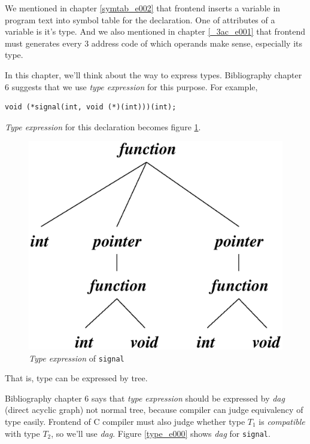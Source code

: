 \label{type_e001}
We mentioned in chapter \ref{symtab_e002} that
frontend inserts a variable in program text into symbol table
for the declaration. One of attributes of a variable is it's type.
And we also mentioned in chapter \ref{_3ac_e001} that
frontend must generates every 3 address code of which operands make
sense, especially its type.

In this chapter, we'll think about the way to express types.
Bibliography \cite{doragon} chapter 6 suggests that we
use {\em type expression} for this purpose. For example,
\begin{verbatim}
void (*signal(int, void (*)(int)))(int);
\end{verbatim}
{\em Type expression} for this declaration becomes figure
\ref{type_e006}.

\hspace{0.5cm}
\begin{figure}[htbp]
\begin{center}
\includegraphics[width=0.5\linewidth,height=0.5\linewidth]{type_expr.eps}
\caption{{\em Type expression} of {\tt{signal}}}
\label{type_e006}
\end{center}
\end{figure}

That is, type can be expressed by tree.

Bibliography \cite{doragon} chapter 6 says that
{\em type expression} should be expressed by {\em dag}
(direct acyclic graph) not normal tree, because
compiler can judge equivalency of type easily. Frontend of C compiler
must also judge whether type $T_1$ is {\it compatible} with
type $T_2$, so we'll use {\em dag}. Figure \ref{type_e000}
shows {\em dag} for {\tt{signal}}.

